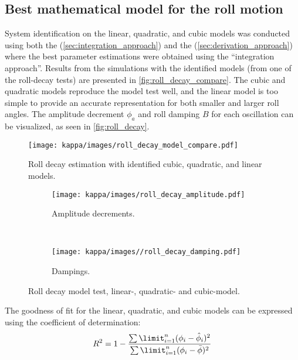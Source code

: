 \subsection{Best mathematical model for the roll motion}
System identification on the linear, quadratic, and cubic models was conducted using both the  (\autoref{sec:integration_approach}) and the  (\autoref{sec:derivation_approach}) where the best parameter estimations were obtained using the ``integration approach''.
Results from the simulations with the identified models (from one of the roll-decay tests) are presented in \autoref{fig:roll_decay_compare}. The cubic and quadratic models reproduce the model test well, and the linear model is too simple to provide an accurate representation for both smaller and larger roll angles. The amplitude decrement $\phi_a$ and roll damping $B$ for each oscillation can be visualized, as seen in \autoref{fig:roll_decay}.
\begin{figure}[h!]
    \centering
    \texttt{[image: kappa/images/roll\_decay\_model\_compare.pdf]}
    \caption{Roll decay estimation with identified cubic, quadratic, and linear models.}
    \label{fig:roll_decay_compare}
\end{figure}
\begin{figure}[h!]
    \begin{subfigure}[b]{0.45\textwidth}
        \centering
        \texttt{[image: kappa/images/roll\_decay\_amplitude.pdf]}
        \caption{Amplitude decrements.}
        \label{fig:roll_decay_amplitude}
    \end{subfigure}
        ~ %
    \begin{subfigure}[b]{0.45\textwidth}
        \centering
        \texttt{[image: kappa/images//roll\_decay\_damping.pdf]}
        \caption{Dampings.}
        \label{fig:roll_decay_damping}
    \end{subfigure}
    \caption{Roll decay model test, linear-, quadratic- and cubic-model.}
    \label{fig:roll_decay}
\end{figure}
The goodness of fit for the linear, quadratic, and cubic models can be expressed using the coefficient of determination:
\begin{equation} \label{eq:R2}
R^2=1-\frac{\sum\limit_{i=1}^{n}(\phi_{i}-\hat{\phi}_i)^2}{\sum\limit_{i=1}^{n}(\phi_i-\bar \phi)^2}
\end{equation}
